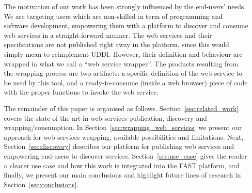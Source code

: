 The motivation of our work has been strongly influenced by the end-users' needs. We are targeting users which are non-skilled in term of programming and software development, empowering them with a platform to discover and consume web services in a straight-forward manner.
The web services and their specifications are not published right away in the platform, since this would simply mean to reimplement UDDI.
However, their definition and behaviour are wrapped in what we call a ``web service wrapper''. The products resulting from the wrapping process are two artifacts: a specific definition of the web service to be used by this tool, and a ready-to-consume (inside a web browser) piece of code with the proper functions to invoke the web service.

The remainder of this paper is organised as follows. Section~\ref{sec:related_work} covers the state of the art in web services publication, discovery and wrapping/consumption. In Section~\ref{sec:wrapping_web_services} we present our approach for web services wrapping, available possibilities and limitations. Next, Section~\ref{sec:discovery} describes our platform for publishing web services and empowering end-users to discover services. Section~\ref{sec:use_case} gives the reader a clearer use case and how this work is integrated into the FAST platform, and finally, we present our main conclusions and highlight future lines of research in Section~\ref{sec:conclusions}.

